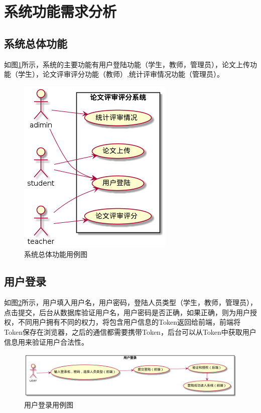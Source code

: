 \section{系统功能需求分析}

\subsection{系统总体功能}

如图\ref{system-usecase}所示，系统的主要功能有用户登陆功能（学生，教师，管理员），论文上传功能（学生），论文评审评分功能（教师）,统计评审情况功能（管理员）。

\begin{figure}[H]
    \centering
    \includegraphics[scale = 0.6]{out/uml/用例图/系统总体功能用例图/系统总体功能用例图.png}
    \caption{\song\wuhao 系统总体功能用例图}
    \label{system-usecase}
\end{figure}

\subsection{用户登录}

如图\ref{login-usecase}所示，用户填入用户名，用户密码，登陆人员类型（学生，教师，管理员），点击提交，后台从数据库验证用户名，用户密码是否正确，如果正确，则为用户授权，不同用户拥有不同的权力，将包含用户信息的Token返回给前端，前端将Token保存在浏览器，之后的通信都需要携带Token，后台可以从Token中获取用户信息用来验证用户合法性。

\begin{figure}[H]
    \centering
    \includegraphics[scale = 0.45]{out/uml/用例图/1-用户登录用例图/1-用户登录用例图.png}
    \caption{\song\wuhao 用户登录用例图}
    \label{login-usecase}
\end{figure}

